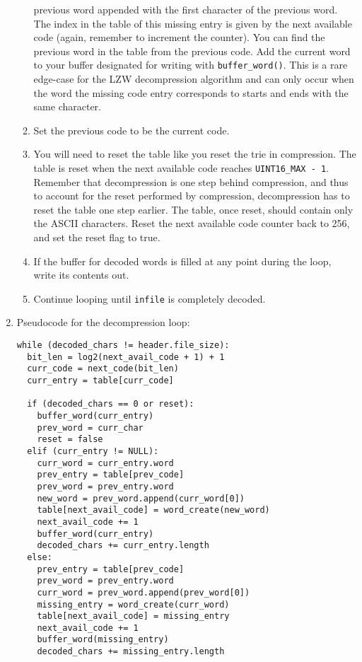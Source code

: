 \documentclass{article}
\begin{document}
\begin{enumerate}
\begin{enumerate}
                previous word appended
                with the first character of the previous word. The index in the
                table of this missing entry is given by the next available code
                (again, remember to increment the counter). You can find the
                previous word in the table from the previous code. Add the
                current word to your buffer designated for writing with
                \texttt{buffer\_word()}. This is a rare edge-case for the
                LZW decompression algorithm and can only occur when the word
                the missing code entry corresponds to starts and ends with the
                same character.
            \item Set the previous code to be the current code.
            \item You will need to reset the table like you reset the trie in
                compression. The table is reset when the next available code
                reaches \texttt{UINT16\_MAX - 1}. Remember that decompression is
                one step behind compression, and thus to account for the reset
                performed by compression, decompression has to reset the table
                one step earlier. The table, once reset, should contain only the
                ASCII characters. Reset the next available code counter back to
                256, and set the reset flag to true.
            \item If the buffer for decoded words is filled at any
                point during the loop, write its contents out.
            \item Continue looping until \texttt{infile} is completely decoded.
        \end{enumerate}
    \item Pseudocode for the decompression loop:
\begin{lstlisting}
while (decoded_chars != header.file_size):
  bit_len = log2(next_avail_code + 1) + 1
  curr_code = next_code(bit_len)
  curr_entry = table[curr_code]

  if (decoded_chars == 0 or reset):
    buffer_word(curr_entry)
    prev_word = curr_char
    reset = false
  elif (curr_entry != NULL):
    curr_word = curr_entry.word
    prev_entry = table[prev_code]
    prev_word = prev_entry.word
    new_word = prev_word.append(curr_word[0])
    table[next_avail_code] = word_create(new_word)
    next_avail_code += 1
    buffer_word(curr_entry)
    decoded_chars += curr_entry.length
  else:
    prev_entry = table[prev_code]
    prev_word = prev_entry.word
    curr_word = prev_word.append(prev_word[0])
    missing_entry = word_create(curr_word)
    table[next_avail_code] = missing_entry
    next_avail_code += 1
    buffer_word(missing_entry)
    decoded_chars += missing_entry.length


\end{lstlisting}
\end{enumerate}
\end{document}
